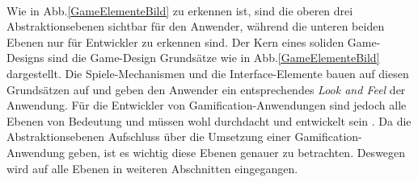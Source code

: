 \documentclass[a4paper,12pt]{scrartcl}
\begin{document}
\\
Wie in Abb.\ref{GameElementeBild} zu erkennen ist, sind die oberen drei Abstraktionsebenen sichtbar für den Anwender, während die unteren beiden Ebenen nur für Entwickler zu erkennen sind. Der Kern eines soliden Game-Designs sind die Game-Design Grundsätze wie in Abb.\ref{GameElementeBild} dargestellt. Die Spiele-Mechanismen und die Interface-Elemente bauen auf diesen Grundsätzen auf und geben den Anwender ein entsprechendes \textit{Look and Feel} der Anwendung. Für die Entwickler von Gamification-Anwendungen sind jedoch alle Ebenen von Bedeutung und müssen wohl durchdacht und entwickelt sein \cite{GameElemente2018}. Da die Abstraktionsebenen Aufschluss über die Umsetzung einer Gamification-Anwendung geben, ist es wichtig diese Ebenen genauer zu betrachten. Deswegen wird auf alle Ebenen in weiteren Abschnitten eingegangen.
\end{document}
